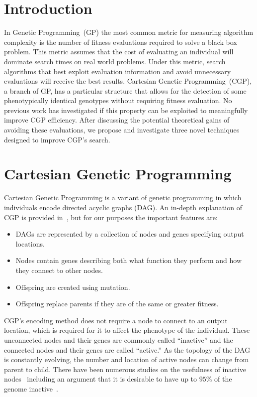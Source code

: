 \documentclass[runningheads,a4paper]{llncs}
\begin{document}
\section{Introduction}
In Genetic Programming~(GP) the most common metric for measuring algorithm complexity
is the number of fitness evaluations required to solve
a black box problem.  This metric assumes that the cost of evaluating an
individual will dominate search times on real world problems.  Under this
metric, search algorithms that best exploit evaluation information and avoid
unnecessary evaluations will receive the best results.  Cartesian Genetic
Programming~(CGP), a branch of GP, has a particular structure that allows
for the detection of some phenotypically identical genotypes without
requiring fitness evaluation.  No previous work has investigated if this
property can be exploited to meaningfully improve CGP efficiency.  After discussing the
potential theoretical gains of avoiding these evaluations, we propose and
investigate three novel techniques designed to improve CGP's
search.


\section{Cartesian Genetic Programming}
\label{sec:cgp}
Cartesian Genetic Programming is a variant of genetic programming in which
individuals encode directed acyclic graphs (DAG).
An in-depth explanation of CGP is provided in~\cite{miller:2011:chapter2}, but for
our purposes the important features are:
\begin{itemize}
  \item DAGs are represented by a collection of nodes and genes specifying output locations.
  \item Nodes contain genes describing both what function they perform
  and how they connect to other nodes.
  \item Offspring are created using mutation.
  \item Offspring replace parents if they are of the same or greater fitness.
\end{itemize}
CGP's encoding method does not require a node
to connect to an output location, which is required for it to
affect the phenotype of the individual.
These unconnected nodes and their genes are commonly called ``inactive''
and the connected nodes and their genes are called ``active.''
As the topology of the DAG is constantly evolving, the number and location of
active nodes can change from parent to child.
There have been numerous studies on the usefulness of inactive nodes~\cite{vassilev:2000:neutrality,yu:2001:neutrality}
including an argument that it is desirable to have up
to $95\%$ of the genome inactive~\cite{miller:2006:redundancy}.
\end{document}
